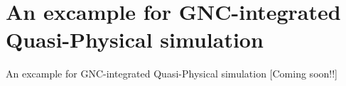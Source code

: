 \section{An excample for GNC-integrated Quasi-Physical simulation}
\begin{frame}{An excample for GNC-integrated Quasi-Physical simulation}
	[Coming soon!!]
\end{frame}